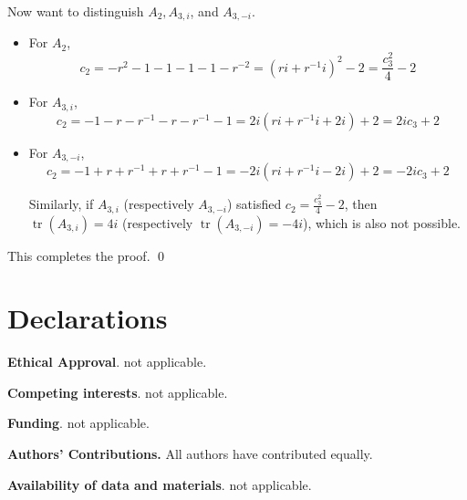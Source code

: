 \documentclass[11pt]{amsart}
\numberwithin{equation}{section}
\theoremstyle{plain}
\theoremstyle{definition}
\numberwithin{equation}{section}
\begin{document}
\begin{enumerate}
\medskip
Now want to distinguish  \( A_2, A_{3,i}\), and \(A_{3,-i} \).
\begin{itemize}
 \item  For \( A_2 \),
\[
c_2 = -r^2 - 1 - 1 - 1 - 1 - r^{-2} = (ri + r^{-1}i)^2 - 2 = \frac{c_3^2}{4} - 2
\]

 \item  For \( A_{3,i} \),
\[
c_2 = -1 - r - r^{-1} - r - r^{-1} - 1 = 2i(ri + r^{-1}i + 2i) + 2 = 2ic_3 + 2
\]

 \item  For \( A_{3,-i} \),
\[
c_2 = -1 + r + r^{-1} + r + r^{-1} - 1 = -2i(ri + r^{-1}i - 2i) + 2 = -2ic_3 + 2
\]

 Similarly, if \( A_{3,i} \) (respectively \( A_{3,-i} \)) satisfied \( c_2 = \frac{c_3^2}{4} - 2 \), then \( \operatorname{tr}(A_{3,i}) = 4i \) (respectively \( \operatorname{tr}(A_{3,-i}) = -4i \)), which is also not possible. 
\end{itemize} \end{enumerate}
This completes the proof. \qed
        
\section*{Declarations} 

	{\bf Ethical Approval}. not applicable.

{\bf Competing interests}. not applicable.

	
	{\bf Funding}. not applicable.

{\bf Authors' Contributions.} All authors have contributed equally. 

{\bf Availability of data and materials}. not applicable.
\end{document}
